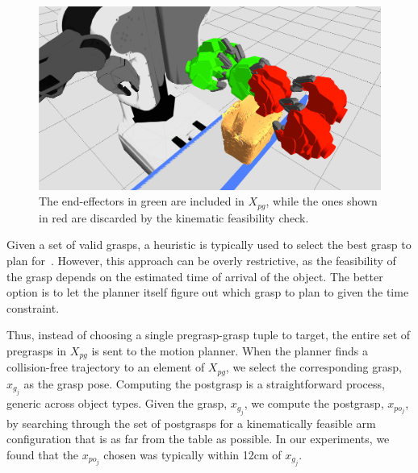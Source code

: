 \documentclass[letterpaper, 10 pt, conference]{ieeeconf}  %
\begin{document}
\begin{figure}[t]
\centering
\includegraphics[width=\columnwidth]{figures/covered_basket-grasps-kinematics_check.png}
\caption{
The end-effectors in green are included in $X_{pg}$, while the ones shown in red are discarded by the kinematic feasibility check.
}
\label{fig:kinematics_feasibility_check}
\end{figure}

Given a set of valid grasps, a heuristic is typically used to select
the best grasp to plan for~\cite{WGGrasping}. However, this approach
can be overly restrictive, as the feasibility of the grasp depends on
the estimated time of arrival of the object. The better option is to
let the planner itself figure out which grasp to plan to given the
time constraint.


Thus, instead of choosing a single pregrasp-grasp tuple to target, the
entire set of pregrasps in $X_{pg}$ is sent to the motion
planner. When the planner finds a collision-free trajectory to an
element of $X_{pg}$, we select the corresponding grasp, $x_{g_j}$ as
the grasp pose. Computing the postgrasp is a straightforward process,
generic across object types. Given the grasp, $x_{g_j}$, we compute
the postgrasp, $x_{po_j}$, by searching through the set of postgrasps
for a kinematically feasible arm configuration that is as far from the
table as possible. In our experiments, we found that the $x_{po_j}$
chosen was typically within 12cm of $x_{g_j}$.
\end{document}
